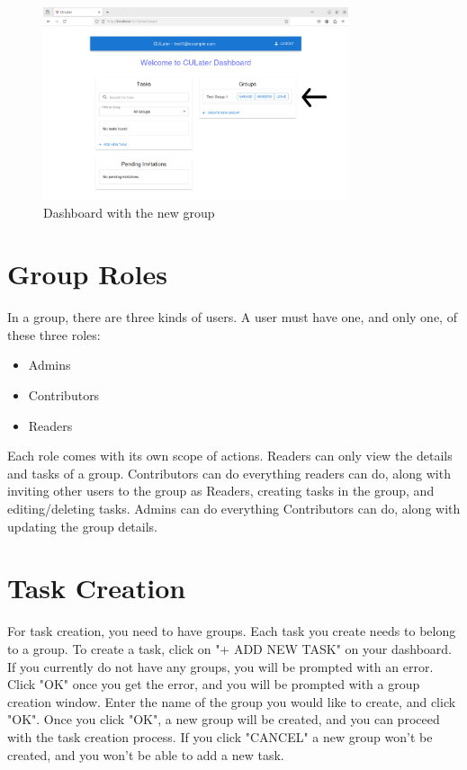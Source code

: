 \documentclass{scrreprt}
\begin{document}
\begin{figure}[htbp]
        \centering
        \includegraphics[width=0.8\textwidth]{working_group_dashboard_after_creation_edited.png}
	\caption{Dashboard with the new group}
	\label{fig:my_label}
\end{figure}

\chapter{Group Roles}
In a group, there are three kinds of users. A user must have one, and only one, of these three roles:

\begin{itemize}
	\item Admins
	\item Contributors
	\item Readers
\end{itemize}

Each role comes with its own scope of actions. Readers can only view the details and tasks of a group. Contributors can do everything readers can do, along with inviting other users to the group as Readers, creating tasks in the group, and editing/deleting tasks. Admins can do everything Contributors can do, along with updating the group details.

\chapter{Task Creation}

For task creation, you need to have groups. Each task you create needs to belong to a group. To create a task, click on "+ ADD NEW TASK" on your dashboard. If you currently do not have any groups, you will be prompted with an error. Click "OK" once you get the error, and you will be prompted with a group creation window. Enter the name of the group you would like to create, and click "OK". Once you click "OK", a new group will be created, and you can proceed with the task creation process. If you click "CANCEL" a new group won't be created, and you won't be able to add a new task.\\
\end{document}
